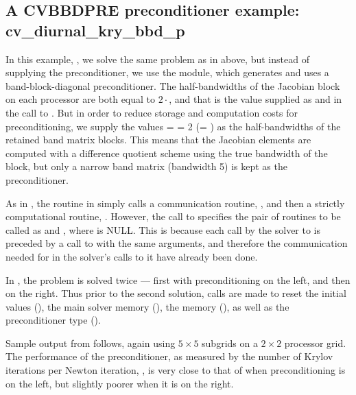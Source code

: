 

\subsection{A CVBBDPRE preconditioner example: cv\_diurnal\_kry\_bbd\_p}\label{ss:cv_diurnal_bbd_p}

In this example, , we solve the same
problem as in 
above, but instead of supplying the preconditioner, we use the {\cvbbdpre} module,
which generates and uses a band-block-diagonal preconditioner.  The
half-bandwidths of the Jacobian block on each processor are both equal to
$2\cdot$, and that is the value supplied as  and 
in the call to .  But in order to reduce storage and computation
costs for preconditioning, we supply the values  =  = 2
(= ) as the half-bandwidths of the retained band matrix blocks.
This means that the Jacobian elements are computed with a difference quotient
scheme using the true bandwidth of the block, but only a narrow band matrix
(bandwidth 5) is kept as the preconditioner.

As in , the  routine in  simply calls a
communication routine, , and then a strictly computational routine,
.  However, the call to  specifies the pair of
routines to be called as  and , where  is NULL.
This is because each call by the solver to  is
preceded by a call to  with the same  arguments, and therefore the
communication needed for  in the solver's calls to it have already been
done.

In , the problem is solved twice --- first with preconditioning
on the left, and then on the right.  Thus prior to the second solution, calls
are made to reset the initial values (), the main solver
memory (), the {\cvbbdpre} memory (),
as well as the preconditioner type ().

Sample output from  follows, again using $5 \times 5$ subgrids
on a $2 \times 2$ processor grid.  The performance of the preconditioner,
as measured by the number of Krylov iterations per Newton iteration,
, is very close to that of  when preconditioning is on
the left, but slightly poorer when it is on the right.


